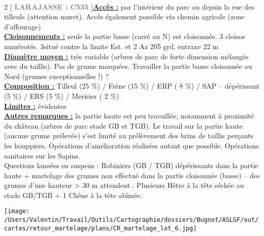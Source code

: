 \documentclass[a4paper,openany]{book}\usepackage[]{graphicx}\usepackage[]{color}
\begin{document}
\\\begin{multicols}{2}
[
\textbf{\textcolor{gray}{
\large LARAJASSE : C535
}}
]\noindent\textbf{\underline{Accès :}} par l'intérieur du parc ou depuis la rue des tilleuls (attention muret). Accès également possible via chemin agricole (zone d'affourage)\vspace{0.1cm} \\\noindent\textbf{\underline{Cloisonnements :}} seule la partie basse (carré au N) est cloisonnée. 3 cloisos numérotés. \No 3situé contre la limite Est.  et 2 Az 205 grd, entraxe 22 m\vspace{0.1cm} \\\noindent\textbf{\underline{Diamètre moyen :}} très variable (arbres de parc de forte dimension mélangés avec du taillis). Pas de grume marquées. Travailler la partie basse cloisonnée au Nord (grumes exceptionnelles !) ?\vspace{0.1cm} \\\noindent\textbf{\underline{Composition :}} Tilleul (25 \%) / Frêne (15 \%) / ERP ( 8 \%) / SAP -- dépérissant (5 \%) / ERS (5 \%) / Merisier ( 2 \%)\vspace{0.1cm} \\\noindent\textbf{\underline{Limites :}} évidentes\vspace{0.1cm} \\\noindent\textbf{\underline{Autres remarques :}} la partie haute est peu travaillée, notamment à proximité du château (arbres de parc stade GB et TGB). Le travail sur la partie haute (aucune grume prélevée) s'est limité au prélèvement des brins de taillis perçants les houppiers. Opérations d'amélioration réalisées autant que possible. Opérations sanitaires sur les Sapins.\\
Questions laissées en suspens : Robiniers (GB / TGB) dépérissants dans la partie haute + martelage des grumes non effectué dans la partie cloisonnée (basse) -- des grumes d'une hauteur > 30 m attendent . Plusieurs Hêtre à la tête séchée au stade GB/TGB + 1 Chêne à la tête abîmée.\vspace{0.1cm} \\\end{multicols}\begin{center}
\texttt{[image: /Users/Valentin/Travail/Outils/Cartographie/dossiers/Bugnot/ASLGF/out/cartes/retour\_martelage/plans/CR\_martelage\_lot\_6.jpg]}
\end{center}\newpage\noindent
\end{document}
